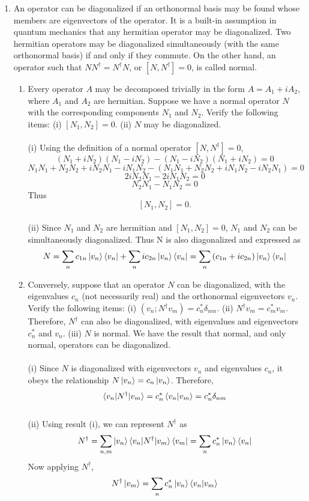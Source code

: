 \documentclass[11pt,letterpaper]{article}
\begin{document}
\begin{enumerate}
\item An operator can be diagonalized if an orthonormal basis may be found whose members are eigenvectors of the operator. It is a built-in assumption in quantum mechanics that any hermitian operator may be diagonalized. Two hermitian operators may be diagonalized simultaneously (with the same orthonormal basis) if and only if they commute. On the other hand, an operator such that $NN^\dag = N^\dag N$, or $[N,N^\dag]=0$, is called normal.
\begin{enumerate}
\item Every operator $A$ may be decomposed trivially in the form $A=A_1+iA_2$, where $A_1$ and $A_2$ are hermitian. Suppose we have a normal operator $N$ with the corresponding components $N_1$ and $N_2$. Verify the following items: (i) $[N_1,N_2] = 0$. (ii) $N$ may be diagonalized.
\\ \\(i) Using the definition of a normal operator $[N,N^\dag]=0$,
$$(N_1+iN_2)(N_1-iN_2)-(N_1-iN_2)(N_1+iN_2) = 0$$
$$N_1N_1+N_2N_2+iN_2N_1-iN_1N_2 - (N_1N_1+N_2N_2+iN_1N_2-iN_2N_1) =0$$
$$2iN_2N_1-2iN_1N_2 = 0$$
$$N_2N_1-N_1N_2 = 0$$
Thus 
$$[N_1,N_2] = 0.$$
\\ (ii) Since $N_1$ and $N_2$ are hermitian and $[N_1,N_2]=0$, $N_1$ and $N_2$ can be simultaneously diagonalized. Thus N is also diagonalized and expressed as
$$N = \sum_{n}{c_{1n}\ket{v_n}\bra{v_n}} + \sum_{n}{ic_{2n}\ket{v_n}\bra{v_n}} = \sum_{n}{(c_{1n}+ic_{2n})\ket{v_n}\bra{v_n}}$$
\item Conversely, suppose that an operator $N$ can be diagonalized, with the eigenvalues $c_n$ (not necessarily real) and the orthonormal eigenvectors $v_n$. Verify the following items: (i) $(v_n; N^\dag v_m) = c_n^*\delta_{nm}$. (ii) $N^\dag v_m = c_m^* v_m$. Therefore, $N^\dag$ can also be diagonalized, with eigenvalues and eigenvectors $c_n^*$ and $v_n$. (iii) $N$ is normal. We have the result that normal, and only normal, operators can be diagonalized. 
\\ \\(i) Since $N$ is diagonalized with eigenvectors $v_n$ and eigenvalues $c_n$, it obeys the relationship $N\ket{v_n} = c_n\ket{v_n}$. Therefore,
$$\braket{v_n|N^\dag|v_m} = c_n^*\braket{v_n|v_m} = c_n^*\delta_{nm}$$
\\ (ii) Using result (i), we can represent $N^\dag$ as
$$N^\dag = \sum_{n,m}{\ket{v_n}\braket{v_n|N^\dag|v_m}\bra{v_m}}=\sum_{n}{c_n^*\ket{v_n}\bra{v_n}}$$
Now applying $N^\dag$,
$$N^\dag\ket{v_m} = \sum_{n}{c_n^*\ket{v_n}\braket{v_n|v_m}}$$

\end{enumerate}
\end{enumerate}
\end{document}
